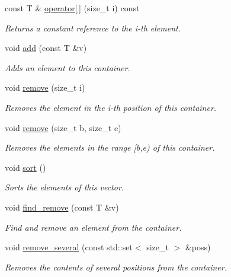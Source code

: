 \begin{DoxyCompactItemize}
const T \& \hyperlink{classlgraph_1_1utils_1_1svector_a364404eb0b1cb3407cdab853256847d3}{operator\mbox{[}$\,$\mbox{]}} (size\+\_\+t i) const
\begin{DoxyCompactList}\small\item\em Returns a constant reference to the i-\/th element. \end{DoxyCompactList}\item 
void \hyperlink{classlgraph_1_1utils_1_1svector_a14ffd05a33eeae26ddb0909d8f64ad28}{add} (const T \&v)
\begin{DoxyCompactList}\small\item\em Adds an element to this container. \end{DoxyCompactList}\item 
void \hyperlink{classlgraph_1_1utils_1_1svector_a9d377cbaa26f09a862334363e2d889cc}{remove} (size\+\_\+t i)
\begin{DoxyCompactList}\small\item\em Removes the element in the i-\/th position of this container. \end{DoxyCompactList}\item 
void \hyperlink{classlgraph_1_1utils_1_1svector_a1df0b9cabdb2e9f572f664d85ba42efb}{remove} (size\+\_\+t b, size\+\_\+t e)
\begin{DoxyCompactList}\small\item\em Removes the elements in the range \mbox{[}b,e) of this container. \end{DoxyCompactList}\item 
void \hyperlink{classlgraph_1_1utils_1_1svector_ac2199e164429f7469decfa9d8f033069}{sort} ()
\begin{DoxyCompactList}\small\item\em Sorts the elements of this vector. \end{DoxyCompactList}\item 
void \hyperlink{classlgraph_1_1utils_1_1svector_a2c67e3086677ea7f0c8526e3d12230aa}{find\+\_\+remove} (const T \&v)
\begin{DoxyCompactList}\small\item\em Find and remove an element from the container. \end{DoxyCompactList}\item 
void \hyperlink{classlgraph_1_1utils_1_1svector_a59ff2525161af10a94a64a0be8204556}{remove\+\_\+several} (const std\+::set$<$ size\+\_\+t $>$ \&poss)
\begin{DoxyCompactList}\small\item\em Removes the contents of several positions from the container. \end{DoxyCompactList}\item 

\end{DoxyCompactItemize}

